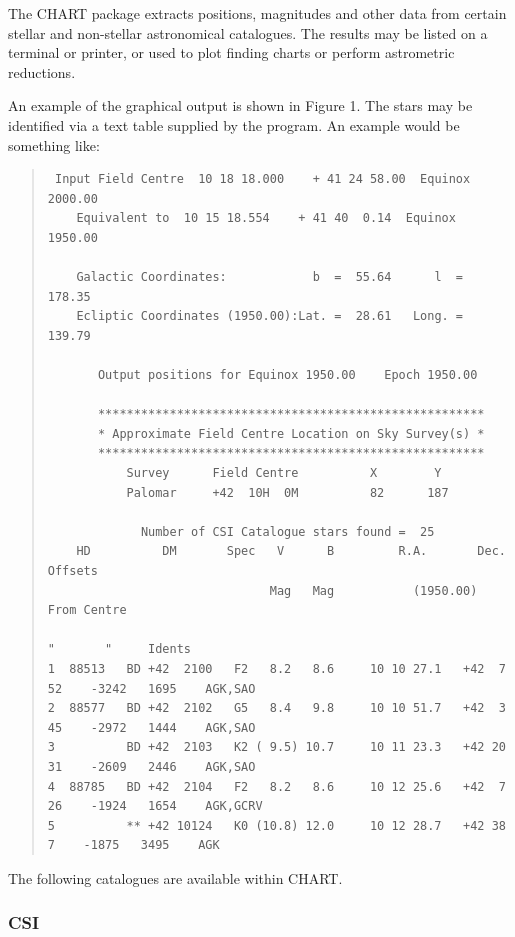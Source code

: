 \documentclass[twoside,11pt]{article}
\newcommand{\xref}[3]{#1}
\newcommand{\CHARTref}{\xref{CHART}{sun32}{}}
\begin{document}
The {\CHARTref} package extracts positions, magnitudes and other data from certain
stellar and non-stellar astronomical catalogues. The results may be listed on
a terminal or printer, or used to plot finding charts or perform astrometric
reductions.

An example of the graphical output is shown in Figure 1.
The stars may be identified via
a text table supplied by the program. An example would be something like:

{\scriptsize
\begin{quote}
\begin{verbatim}
 Input Field Centre  10 18 18.000    + 41 24 58.00  Equinox 2000.00
    Equivalent to  10 15 18.554    + 41 40  0.14  Equinox 1950.00

    Galactic Coordinates:            b  =  55.64      l  = 178.35
    Ecliptic Coordinates (1950.00):Lat. =  28.61   Long. = 139.79

       Output positions for Equinox 1950.00    Epoch 1950.00

       ******************************************************
       * Approximate Field Centre Location on Sky Survey(s) *
       ******************************************************
           Survey      Field Centre          X        Y
           Palomar     +42  10H  0M          82      187

             Number of CSI Catalogue stars found =  25
    HD          DM       Spec   V      B         R.A.       Dec.        Offsets
                               Mag   Mag           (1950.00)           From Centre
                                                                          "       "     Idents
1  88513   BD +42  2100   F2   8.2   8.6     10 10 27.1   +42  7 52    -3242   1695    AGK,SAO
2  88577   BD +42  2102   G5   8.4   9.8     10 10 51.7   +42  3 45    -2972   1444    AGK,SAO
3          BD +42  2103   K2 ( 9.5) 10.7     10 11 23.3   +42 20 31    -2609   2446    AGK,SAO
4  88785   BD +42  2104   F2   8.2   8.6     10 12 25.6   +42  7 26    -1924   1654    AGK,GCRV
5          ** +42 10124   K0 (10.8) 12.0     10 12 28.7   +42 38  7    -1875   3495    AGK
\end{verbatim}
\end{quote}
}

The following catalogues are available within CHART.

\subsubsection{CSI}
\end{document}
